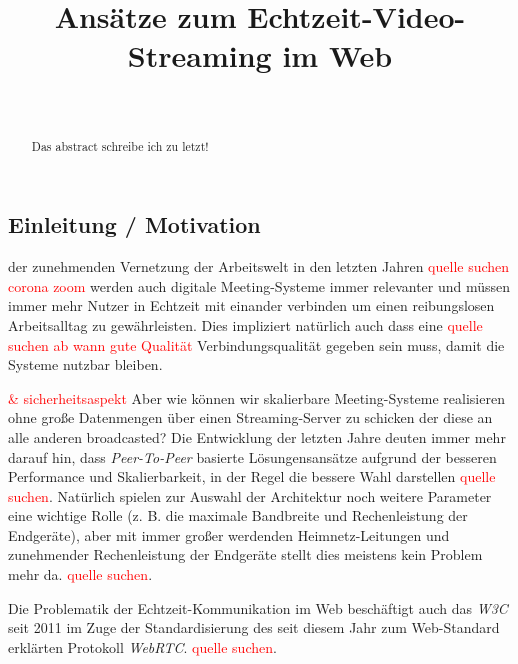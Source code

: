 \documentclass[journal]{IEEEtran}
\title{Ansätze zum Echtzeit-Video-Streaming im Web}
\author{
	\IEEEauthorblockN{Maximilian Schulke \textit{(Matrikel-Nr. 20215853)}}\\
	\IEEEauthorblockA{
		Technische Hochschule Brandenburg \\
		B.Sc. Medieninformatik \\
		Computergrafik
	}
}
\begin{document}
\begin{onecolumn}

\maketitle

\begin{abstract}
	\lipsum[1-2][2-3]
	\lipsum[1-2][2-3]
	Das abstract schreibe ich zu letzt!
\end{abstract}

\tableofcontents
\end{onecolumn}

\begin{twocolumn}

\section{Einleitung / Motivation}
 der zunehmenden Vernetzung der Arbeitswelt
in den letzten Jahren \textcolor{red}{quelle suchen corona zoom} werden auch
digitale Meeting-Systeme immer relevanter und müssen immer mehr Nutzer in
Echtzeit mit einander verbinden um einen reibungslosen Arbeitsalltag zu
gewährleisten. Dies impliziert natürlich auch dass eine \textcolor{red}{quelle
suchen ab wann gute Qualität} Verbindungsqualität gegeben sein muss, damit die
Systeme nutzbar bleiben.

\textcolor{red}{\& sicherheitsaspekt}
Aber wie können wir skalierbare Meeting-Systeme realisieren ohne große
Datenmengen über einen Streaming-Server zu schicken der diese an alle anderen
broadcasted? Die Entwicklung der letzten Jahre deuten immer mehr darauf hin,
dass \textit{Peer-To-Peer} basierte Lösungensansätze aufgrund der besseren
Performance und Skalierbarkeit, in der Regel die bessere Wahl darstellen
\textcolor{red}{quelle suchen}. Natürlich spielen zur Auswahl der Architektur
noch weitere Parameter eine wichtige Rolle (z. B. die maximale Bandbreite und
Rechenleistung der Endgeräte), aber mit immer großer werdenden
Heimnetz-Leitungen und zunehmender Rechenleistung der Endgeräte stellt dies
meistens kein Problem mehr da. \textcolor{red}{quelle suchen}.

Die Problematik der Echtzeit-Kommunikation im Web beschäftigt auch
das \textit{W3C} seit 2011 im Zuge der Standardisierung des seit diesem Jahr
zum Web-Standard erklärten Protokoll \textit{WebRTC}. \textcolor{red}{quelle
suchen}.


\end{twocolumn}
\end{document}

